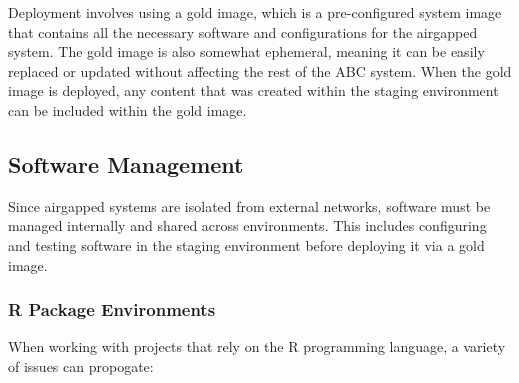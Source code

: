 \documentclass{amia}
\begin{document}
Deployment involves using a gold image, which is a pre-configured system image that contains all the necessary software and configurations for the airgapped system. The gold image is also somewhat ephemeral, meaning it can be easily replaced or updated without affecting the rest of the ABC system. When the gold image is deployed, any content that was created within the staging environment can be included within the gold image. 

\subsection*{Software Management}

Since airgapped systems are isolated from external networks, software must be managed internally and shared across environments. This includes configuring and testing software in the staging environment before deploying it via a gold image. 

\subsubsection{R Package Environments}

When working with projects that rely on the R programming language, a variety of issues can propogate:
\end{document}
